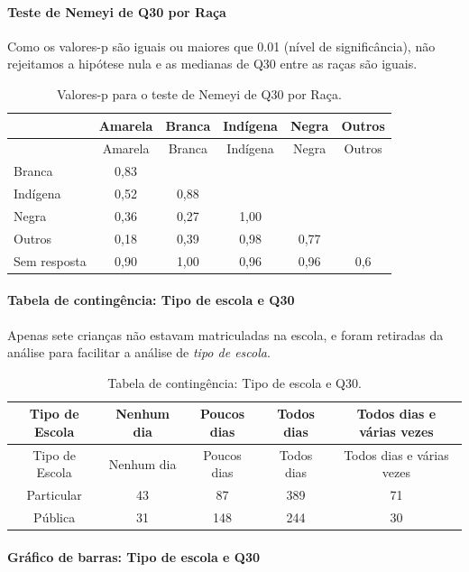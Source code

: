 \documentclass[]{article}
\let\oldparagraph\paragraph
\renewcommand{\paragraph}[1]{\oldparagraph{#1}\mbox{}}
\begin{document}
\hypertarget{teste-de-nemeyi-de-q30-por-rauxe7a}{%
\paragraph{Teste de Nemeyi de Q30 por Raça}\label{teste-de-nemeyi-de-q30-por-rauxe7a}}

Como os valores-p são iguais ou maiores que 0.01 (nível de significância), não rejeitamos a hipótese nula e as medianas de Q30 entre as raças são iguais.

\begin{longtable}[]{@{}lccccc@{}}
\caption{\label{tab:unnamed-chunk-995}Valores-p para o teste de Nemeyi de Q30 por Raça.}\tabularnewline
\toprule
& Amarela & Branca & Indígena & Negra & Outros\tabularnewline
\midrule
\endfirsthead
\toprule
& Amarela & Branca & Indígena & Negra & Outros\tabularnewline
\midrule
\endhead
Branca & 0,83 & & & &\tabularnewline
Indígena & 0,52 & 0,88 & & &\tabularnewline
Negra & 0,36 & 0,27 & 1,00 & &\tabularnewline
Outros & 0,18 & 0,39 & 0,98 & 0,77 &\tabularnewline
Sem resposta & 0,90 & 1,00 & 0,96 & 0,96 & 0,6\tabularnewline
\bottomrule
\end{longtable}

\cleardoublepage

\hypertarget{tabela-de-continguxeancia-tipo-de-escola-e-q30}{%
\paragraph{Tabela de contingência: Tipo de escola e Q30}\label{tabela-de-continguxeancia-tipo-de-escola-e-q30}}

Apenas sete crianças não estavam matriculadas na escola, e foram retiradas da análise para facilitar a análise de \emph{tipo de escola}.

\begin{longtable}[]{@{}ccccc@{}}
\caption{\label{tab:unnamed-chunk-996}Tabela de contingência: Tipo de escola e Q30.}\tabularnewline
\toprule
Tipo de Escola & Nenhum dia & Poucos dias & Todos dias & Todos dias e várias vezes\tabularnewline
\midrule
\endfirsthead
\toprule
Tipo de Escola & Nenhum dia & Poucos dias & Todos dias & Todos dias e várias vezes\tabularnewline
\midrule
\endhead
Particular & 43 & 87 & 389 & 71\tabularnewline
Pública & 31 & 148 & 244 & 30\tabularnewline
\bottomrule
\end{longtable}

\hypertarget{gruxe1fico-de-barras-tipo-de-escola-e-q30}{%
\paragraph{Gráfico de barras: Tipo de escola e Q30}\label{gruxe1fico-de-barras-tipo-de-escola-e-q30}}
\end{document}
